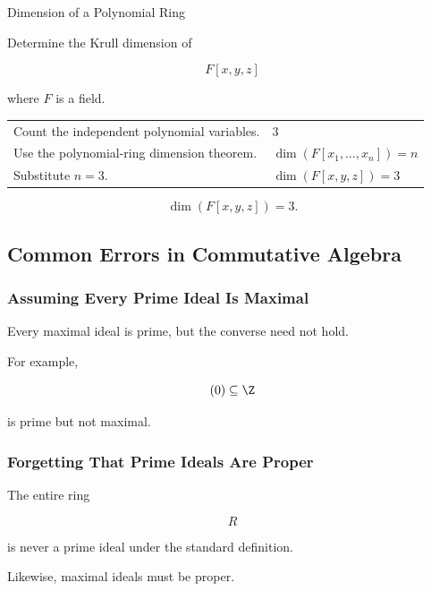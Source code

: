 \begin{workedexamplebox}{Dimension of a Polynomial Ring}

Determine the Krull dimension of

\[ F[x,y,z] \]

where \(F\) is a field.

\begin{tabularx}{\textwidth}{@{}>{\raggedright\arraybackslash}p{}X@{}}
Count the independent polynomial variables. & \(3\)\\
Use the polynomial-ring dimension theorem. & \(\dim(F[x_1,\ldots,x_n])=n\)\\
Substitute \(n=3\). & \(\dim(F[x,y,z])=3\)
\end{tabularx}

\begin{answerbox}
\[ \boxed{\dim(F[x,y,z])=3.} \]
\end{answerbox}
\end{workedexamplebox}

\subsection{Common Errors in Commutative Algebra}
\label{subsec:commutative-algebra-errors}

\subsubsection{Assuming Every Prime Ideal Is Maximal}

Every maximal ideal is prime, but the converse need not hold.

For example,

\[ (0)\subseteq\Z \]

is prime but not maximal.

\subsubsection{Forgetting That Prime Ideals Are Proper}

The entire ring

\[ R \]

is never a prime ideal under the standard definition.

Likewise, maximal ideals must be proper.

